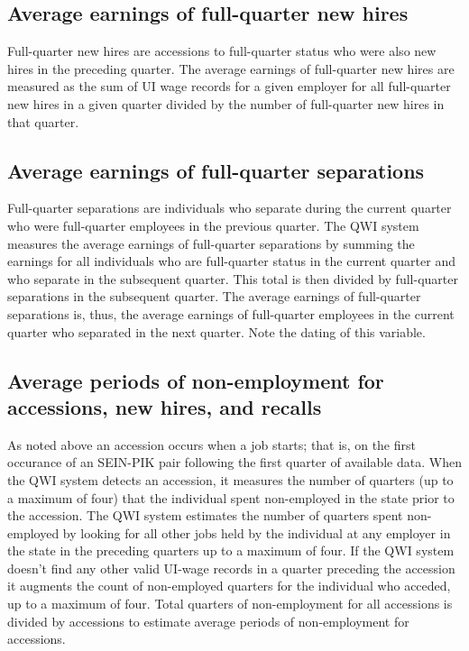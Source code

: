 \subsection{Average earnings of full-quarter new hires}


Full-quarter new hires are accessions to full-quarter status who were also
new hires in the preceding quarter. The average earnings of full-quarter new
hires are measured as the sum of UI wage records for a given
employer for all full-quarter new hires in a given quarter divided by the
number of full-quarter new hires in that quarter.

\subsection{Average earnings of full-quarter separations}


Full-quarter separations are individuals who separate during the current
quarter who were full-quarter employees in the previous quarter. The QWI
system measures the average earnings of full-quarter separations by summing
the earnings for all individuals who are full-quarter status in the current
quarter and who separate in the subsequent quarter. This total is then
divided by full-quarter separations in the subsequent quarter. The average
earnings of full-quarter separations is, thus, the average earnings of
full-quarter employees in the current quarter who separated in the next
quarter. Note the dating of this variable.

\subsection{Average periods of non-employment for accessions, new hires, and
recalls}


As noted above an accession occurs when a job starts; that is, on the first
occurance of an SEIN-PIK pair following the first quarter
of available data. When the QWI system detects an accession, it measures the
number of quarters (up to a maximum of four) that the individual spent
non-employed in the state prior to the accession. The QWI system estimates
the number of quarters spent non-employed by looking for all other jobs held
by the individual at any employer in the state in the preceding quarters up
to a maximum of four. If the QWI system doesn't find any other valid %
UI-wage records in a quarter preceding the accession it augments
the count of non-employed quarters for the individual who acceded, up to a
maximum of four. Total quarters of non-employment for all accessions is
divided by accessions to estimate average periods of non-employment for
accessions.

